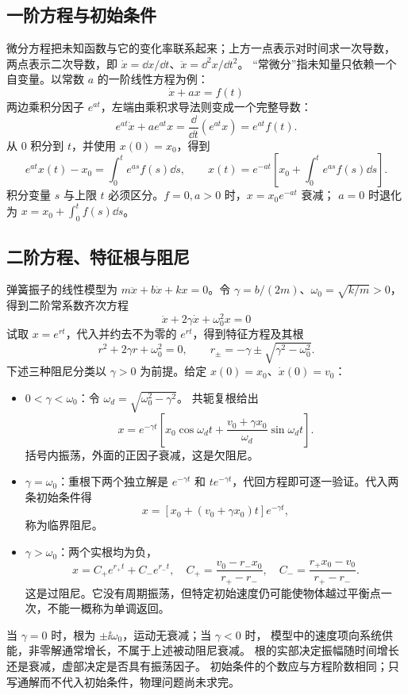 \subsection{一阶方程与初始条件}
微分方程把未知函数与它的变化率联系起来；上方一点表示对时间求一次导数，
两点表示二次导数，即 $\dot x=\dd x/\dd t$、$\ddot x=\dd^2x/\dd t^2$。
“常微分”指未知量只依赖一个自变量。以常数 $a$ 的一阶线性方程为例：
\begin{equation}
 \dot x+ax=f(t)
\end{equation}
两边乘积分因子 $e^{at}$，左端由乘积求导法则变成一个完整导数：
\[
 e^{at}\dot x+ae^{at}x=\frac{\dd}{\dd t}(e^{at}x)=e^{at}f(t).
\]
从 $0$ 积分到 $t$，并使用 $x(0)=x_0$，得到
\[
 e^{at}x(t)-x_0=\int_0^t e^{as}f(s)\dd s,\qquad
 \boxed{x(t)=e^{-at}\left[x_0+\int_0^t e^{as}f(s)\dd s\right]}.
\]
积分变量 $s$ 与上限 $t$ 必须区分。$f=0,a>0$ 时，$x=x_0e^{-at}$ 衰减；
$a=0$ 时退化为 $x=x_0+\int_0^t f(s)\dd s$。

\subsection{二阶方程、特征根与阻尼}
弹簧振子的线性模型为 $m\ddot x+b\dot x+kx=0$。令
$\gamma=b/(2m)$、$\omega_0=\sqrt{k/m}>0$，得到二阶常系数齐次方程
\begin{equation}
 \ddot x+2\gamma\dot x+\omega_0^2x=0
\end{equation}
试取 $x=e^{rt}$，代入并约去不为零的 $e^{rt}$，得到特征方程及其根
\[
 r^2+2\gamma r+\omega_0^2=0,\qquad r_\pm=-\gamma\pm\sqrt{\gamma^2-\omega_0^2}.
\]
下述三种阻尼分类以 $\gamma>0$ 为前提。给定 $x(0)=x_0$、$\dot x(0)=v_0$：
\begin{itemize}
 \item $0<\gamma<\omega_0$：令 $\omega_d=\sqrt{\omega_0^2-\gamma^2}$。
 共轭复根给出
 \[
 x=e^{-\gamma t}\left[x_0\cos\omega_dt+
 \frac{v_0+\gamma x_0}{\omega_d}\sin\omega_dt\right].
 \]
 括号内振荡，外面的正因子衰减，这是欠阻尼。
 \item $\gamma=\omega_0$：重根下两个独立解是 $e^{-\gamma t}$ 和
 $te^{-\gamma t}$，代回方程即可逐一验证。代入两条初始条件得
 \[
 x=[x_0+(v_0+\gamma x_0)t]e^{-\gamma t},
 \]
 称为临界阻尼。
 \item $\gamma>\omega_0$：两个实根均为负，
 \[
 x=C_+e^{r_+t}+C_-e^{r_-t},\quad
 C_+=\frac{v_0-r_-x_0}{r_+-r_-},\quad
 C_-=\frac{r_+x_0-v_0}{r_+-r_-}.
 \]
 这是过阻尼。它没有周期振荡，但特定初始速度仍可能使物体越过平衡点一次，不能一概称为单调返回。
\end{itemize}
当 $\gamma=0$ 时，根为 $\pm\ii\omega_0$，运动无衰减；当 $\gamma<0$ 时，
模型中的速度项向系统供能，非零解通常增长，不属于上述被动阻尼衰减。
根的实部决定振幅随时间增长还是衰减，虚部决定是否具有振荡因子。
初始条件的个数应与方程阶数相同；只写通解而不代入初始条件，物理问题尚未求完。

